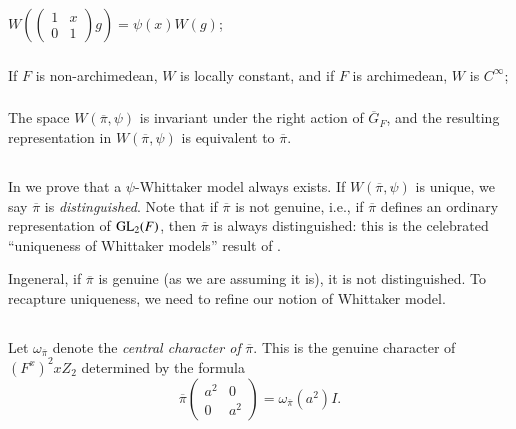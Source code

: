 \subsubsection{}\label{art1-sec3.1.1}
$W\left(\left(\begin{smallmatrix} 1 & x\\ 0 & 1\end{smallmatrix}\right)g\right)=\psi(x)W(g)$;

\subsubsection{}\label{art1-sec3.1.2}
If $F$ is non-archimedean, $W$ is locally constant, and if $F$ is archi\-medean, $W$ is $C^{\infty}$;

\subsubsection{}\label{art1-sec3.1.3}
The space $W(\overline{\pi},\psi)$ is invariant under the right action of $\overline{G}_{F}$, and the resulting representation in $W(\overline{\pi},\psi)$ is equivalent to $\overline{\pi}$.

\subsection{}\label{art1-sec3.2}
In \cite{GeHPS} we prove that a $\psi$-Whittaker model always exists. If $W(\overline{\pi},\psi)$ is unique, we say $\overline{\pi}$ is {\em distinguished}. Note that if $\overline{\pi}$ is not genuine, i.e., if $\overline{\pi}$ defines an ordinary representation of $\mathrm{GL}_{2}(F)$, then $\overline{\pi}$ is always distinguished: this is the celebrated ``uniqueness of Whittaker models'' result of \cite{Jacquet-Langlands}.

In\pageoriginale general, if $\overline{\pi}$ is genuine (as we are assuming it is), it is not distinguished. To recapture uniqueness, we need to refine our notion of Whittaker model.

\subsection{}\label{art1-sec3.3}
Let $\omega_{\overline{\pi}}$ denote the {\em central character of} $\overline{\pi}$. This is the genuine character of $(F^{x})^{2}xZ_{2}$ determined by the formula
\setcounter{equation}{0}
\begin{equation}
\overline{\pi}\left(\begin{matrix} a^{2} & 0\\ 0 & a^{2}\end{matrix}\right)=\omega_{\overline{\pi}}(a^{2})I.\label{art1-eq3.3.1}
\end{equation}

